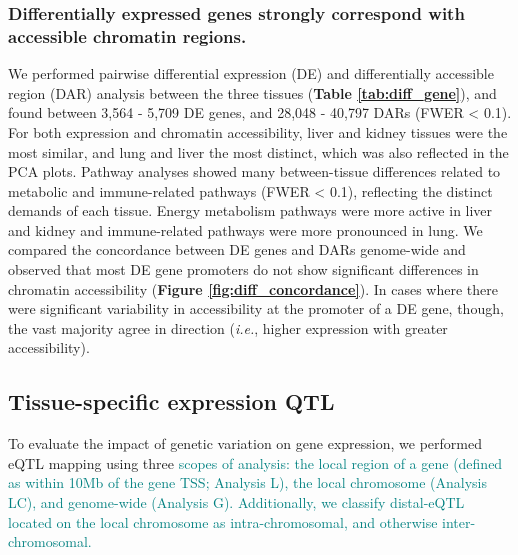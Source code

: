 \documentclass[9pt,twocolumn,twoside]{gsajnl}
\newcommand{\ie}{\emph{i.e.}\xspace}
\newcommand{\GKinline}[1]{\textcolor{teal}{#1}}
\begin{document}
\subsubsection{Differentially expressed genes strongly correspond with accessible chromatin regions.} We performed pairwise differential expression (DE) and differentially accessible region (DAR) analysis between the three tissues (\textbf{Table \ref{tab:diff_gene}}), and found between 3,564 - 5,709 DE genes, and 28,048 - 40,797 DARs (FWER < 0.1). For both expression and chromatin accessibility, liver and kidney tissues were the most similar, and lung and liver the most distinct, which was also reflected in the PCA plots. Pathway analyses showed many between-tissue differences related to metabolic and immune-related pathways (FWER < 0.1), reflecting the distinct demands of each tissue. Energy metabolism pathways were more active in liver and kidney and immune-related pathways were more pronounced in lung. We compared the concordance between DE genes and DARs genome-wide and observed that most DE gene promoters do not show significant differences in chromatin accessibility (\textbf{Figure \ref{fig:diff_concordance}}). In cases where there were significant variability in accessibility at the promoter of a DE gene, though, the vast majority agree in direction (\ie, higher expression with greater accessibility).

\subsection{Tissue-specific expression QTL}

To evaluate the impact of genetic variation on gene expression, we performed eQTL mapping using three \GKinline{scopes of analysis: the local region of a gene (defined as within 10Mb of the gene TSS; Analysis L), the local chromosome (Analysis LC), and genome-wide (Analysis G). Additionally, we classify distal-eQTL located on the local chromosome as intra-chromosomal, and otherwise inter-chromosomal.}
\end{document}
